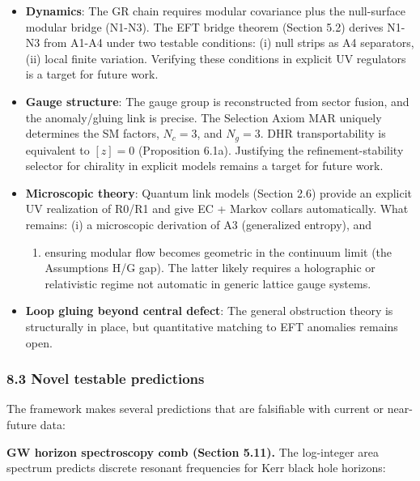 \documentclass[
]{article}
\providecommand{\tightlist}{%
  \setlength{\itemsep}{0pt}\setlength{\parskip}{0pt}}
\begin{document}
\begin{itemize}
\tightlist
\item
  \textbf{Dynamics}: The GR chain requires modular covariance plus the
  null-surface modular bridge (N1-N3). The EFT bridge theorem (Section
  5.2) derives N1-N3 from A1-A4 under two testable conditions: (i) null
  strips as A4 separators, (ii) local finite variation. Verifying these
  conditions in explicit UV regulators is a target for future work.
\item
  \textbf{Gauge structure}: The gauge group is reconstructed from sector
  fusion, and the anomaly/gluing link is precise. The Selection Axiom
  MAR uniquely determines the SM factors, \(N_c = 3\), and \(N_g = 3\).
  DHR transportability is equivalent to \([z]=0\) (Proposition 6.1a).
  Justifying the refinement-stability selector for chirality in explicit
  models remains a target for future work.
\item
  \textbf{Microscopic theory}: Quantum link models (Section 2.6) provide
  an explicit UV realization of R0/R1 and give EC + Markov collars
  automatically. What remains: (i) a microscopic derivation of A3
  (generalized entropy), and

  \begin{enumerate}
  \def\labelenumi{(\roman{enumi})}
  \setcounter{enumi}{1}
  \tightlist
  \item
    ensuring modular flow becomes geometric in the continuum limit (the
    Assumptions H/G gap). The latter likely requires a holographic or
    relativistic regime not automatic in generic lattice gauge systems.
  \end{enumerate}
\item
  \textbf{Loop gluing beyond central defect}: The general obstruction
  theory is structurally in place, but quantitative matching to EFT
  anomalies remains open.
\end{itemize}

\subsubsection{8.3 Novel testable
predictions}\label{novel-testable-predictions}

The framework makes several predictions that are falsifiable with
current or near-future data:

\textbf{GW horizon spectroscopy comb (Section 5.11).} The log-integer
area spectrum predicts discrete resonant frequencies for Kerr black hole
horizons:
\end{document}
